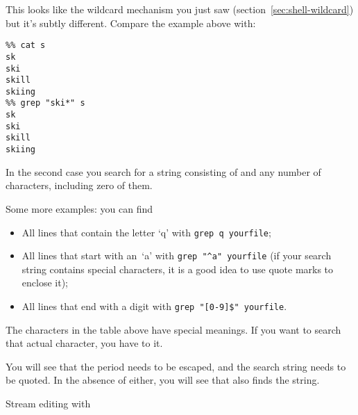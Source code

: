 This looks like the wildcard mechanism you just saw
(section~\ref{sec:shell-wildcard}) but it's subtly different. Compare
the example above with:
\begin{verbatim}
%% cat s
sk
ski
skill
skiing
%% grep "ski*" s
sk
ski
skill
skiing
\end{verbatim}
In the second case you search for a string consisting of  and
any number of  characters, including zero of them.

Some more examples: you can find
\begin{itemize}
\item All lines that contain the letter `q' with \verb+grep q yourfile+;
\item All lines that start with an~`a' with \verb+grep "^a" yourfile+
  (if your search string contains special characters, it is a good
  idea to use quote marks to enclose it);
\item All lines that end with a digit with \verb+grep "[0-9]$" yourfile+.
\end{itemize}



The characters in the table above have special meanings. If you want
to search that actual character, you have to  it.

{You will see that the period needs to be escaped, and the search
  string needs to be quoted. In the absence of either, you will see
  that  also finds the  string.}{}

 {Stream editing with \protect{}}

